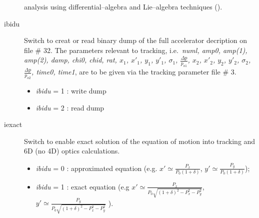 \documentclass[a4paper,11pt]{report}
\begin{document}
\begin{description}
  analysis using differential--algebra and Lie--algebra techniques
  (\cite{Refine}).
\item [ibidu] Switch to creat or read binary dump of the full
  accelerator decription on file \# 32. The parameters relevant to
  tracking, i.e.\ {\em numl, amp0, amp(1), amp(2), damp, chi0, chid,
    rat, $x_1$, $x'_1$, $y_1$, $y'_1$, ${\sigma}_1$, $\frac{\Delta
      p}{p_{o1}}$, $x_2$, $x'_2$, $y_2$, $y'_2$, ${\sigma}_2$,
    $\frac{\Delta p}{p_{o2}}$, time0, time1}, are to be given via the
  tracking parameter file \# 3.
 \begin{itemize}
 \item {\em ibidu} \/= 1 : write dump
 \item {\em ibidu} \/= 2 : read dump
 \end{itemize}
\item [iexact] Switch to enable exact solution of the equation of motion into
  tracking and 6D (no 4D) optics calculations.
  \begin{itemize}
    \item {\em ibidu} \/= 0 : approximated equation
              (e.g. $x'\simeq \frac{P_x}{P_0(1+\delta)}$,
                    $y'\simeq \frac{P_y}{P_0(1+\delta)}$);
    \item {\em ibidu} \/= 1 : exact equation (e.g
      $x'\simeq \frac{P_x}{P_0\sqrt{(1+\delta)^2-P_x^2-P_y^2}}$,
      $y'\simeq \frac{P_y}{P_0\sqrt{(1+\delta)^2-P_x^2-P_y^2}}$ ).
 \end{itemize}
\end{description}
\end{document}
